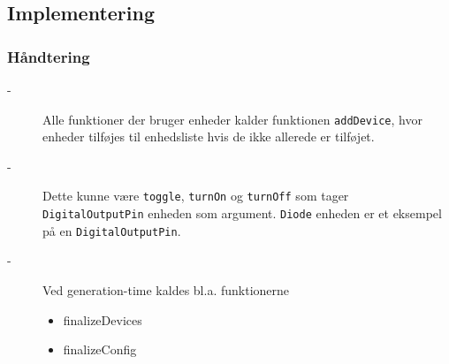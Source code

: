\documentclass[t]{beamer}
\begin{document}
\subsection{Implementering}

\begin{frame}
  \frametitle{Håndtering}
  
  \begin{description}
  \item[-] Alle funktioner der bruger enheder kalder funktionen
    \texttt{addDevice}, hvor enheder tilføjes til enhedsliste hvis de
    ikke allerede er tilføjet.
    
  \item[-] Dette kunne være \texttt{toggle}, \texttt{turnOn} og \texttt{turnOff}
    som tager \texttt{DigitalOutputPin} enheden som argument. \texttt{Diode} enheden er
    et eksempel på en \texttt{DigitalOutputPin}.
    
  \item[-] Ved generation-time kaldes bl.a. funktionerne
    \begin{itemize}
    \item finalizeDevices
    \item finalizeConfig
    \end{itemize}
  \end{description}
\end{frame}
\end{document}
